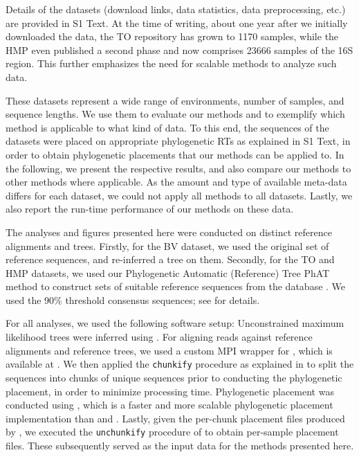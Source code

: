 Details of the datasets (download links, data statistics, data preprocessing, etc.)
are provided in S1 Text. %
At the time of writing, about one year after we initially downloaded the data,
the \ac{TO} repository has grown to \num{1 170} samples,
while the \ac{HMP} even published a second phase and now comprises \num{23 666} samples of the 16S region.
This further emphasizes the need for scalable methods to analyze such data.

These datasets represent a wide range of environments, number of samples, and sequence lengths.
We use them to evaluate our methods and to exemplify which method is applicable to what kind of data.
To this end, the sequences of the datasets were placed on appropriate phylogenetic \acp{RT} as explained
in S1 Text, in order to obtain phylogenetic placements that our methods can be applied to.
In the following, we present the respective results, and also compare our methods to other methods
where applicable.
As the amount and type of available meta-data differs for each dataset,
we could not apply all methods to all datasets.
Lastly, we also report the run-time performance of our methods on these data.

The analyses and figures presented here were conducted on distinct reference alignments and trees.
Firstly, for the \ac{BV} dataset, we used the original set of reference sequences, and re-inferred a tree on them.
Secondly, for the \ac{TO} and \ac{HMP} datasets, we used our Phylogenetic Automatic (Reference) Tree \ac{PhAT} method \cite{Czech2018}
to construct sets of suitable reference sequences from the  database \cite{Quast2013,Yilmaz2014}.
We used the 90\% threshold consensus sequences;
see \cite{Czech2018} for details.

For all analyses, we used the following software setup:
Unconstrained maximum likelihood trees were inferred using  \cite{Stamatakis2014}.
For aligning reads against reference alignments and reference trees,
we used a custom MPI wrapper for  \cite{Berger2011a,Berger2012},
which is available at \cite{PaPaRaMPI}.
We then applied the \texttt{chunkify} procedure as explained in \cite{Czech2018}
to split the sequences into chunks of unique sequences prior to conducting the phylogenetic placement,
in order to minimize processing time.
Phylogenetic placement was conducted using  \cite{Barbera2018},
which is a faster and more scalable phylogenetic placement implementation
than  \cite{Berger2011} and  \cite{Matsen2010}.
Lastly, given the per-chunk placement files produced by , we executed the \texttt{unchunkify} procedure of \cite{Czech2018}
to obtain per-sample placement files. These subsequently served as the input data for the methods presented here.

